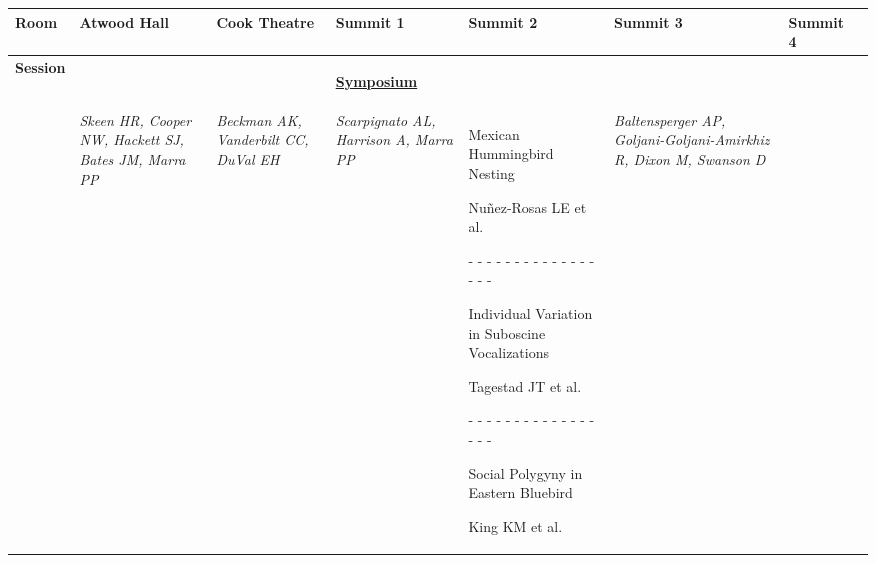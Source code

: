 \begin{tabular}{|x{0.8cm}|x{2.65cm}|x{2.65cm}|a{2.65cm}|y{2.65cm}|x{2.65cm}|x{2.65cm}|@{}m{0pt}@{}}\hline
Room & Atwood Hall & Cook Theatre & Summit 1 & Summit 2 & Summit 3 & Summit 4&\\
\hline
\rule{0pt}{1em} \textbf{Session} &\footnotesize \textbf{} & \footnotesize \textbf{} & \footnotesize \textbf{\underline{Symposium}} \par \textbf{} & \footnotesize \textbf{} & \footnotesize \textbf{} & \footnotesize \textbf{}&\\[25ex]
\hline
{}& \par \vspace{8pt} \textit{Skeen HR, Cooper NW, Hackett SJ, Bates JM, Marra PP} &  \par \vspace{8pt} \textit{Beckman AK, Vanderbilt CC, DuVal EH} &  \par \vspace{8pt} \textit{Scarpignato AL, Harrison A, Marra PP} & \scriptsize Mexican Hummingbird Nesting\par \tiny Nu\~{n}ez-Rosas LE et al.\par - - - - - - - - - - - - - - - - - \par \vspace{2pt} \scriptsize Individual Variation in Suboscine Vocalizations\par \tiny Tagestad JT et al.\par - - - - - - - - - - - - - - - - - \par \vspace{2pt} \scriptsize Social Polygyny in Eastern Bluebird\par \tiny King KM et al. &  \par \vspace{8pt} \textit{Baltensperger AP, Goljani-Goljani-Amirkhiz R, Dixon M, Swanson D} &  \par \vspace{8pt} \textit{}&\\[25ex]

\end{tabular}

